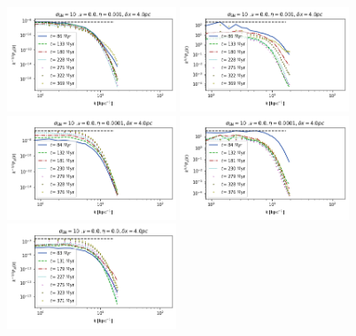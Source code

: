 \documentclass[iop,apj,numberedappendix,twocolappendix]{emulateapj}
\begin{document}
\begin{figure}
\centering
\includegraphics[trim=0.0cm 0.00cm 0.0cm 0.0cm,clip=true,width=0.45\textwidth]{csc_figs/4pcPm0e-3_02SNBpower.png}
\includegraphics[trim=0.0cm 0.00cm 0.0cm 0.0cm,clip=true,width=0.45\textwidth]{csc_figs/4pcPm0e-3_02SNkpower.png}
\includegraphics[trim=0.0cm 0.00cm 0.0cm 0.0cm,clip=true,width=0.45\textwidth]{csc_figs/4pcPm0e-4_02SNBpower.png}
\includegraphics[trim=0.0cm 0.00cm 0.0cm 0.0cm,clip=true,width=0.45\textwidth]{csc_figs/4pcPm0e-4_02SNkpower.png}
\includegraphics[trim=0.0cm 0.00cm 0.0cm 0.0cm,clip=true,width=0.45\textwidth]{csc_figs/4pcPm0e-0_02SNBpower.png}

\end{figure}
\end{document}

